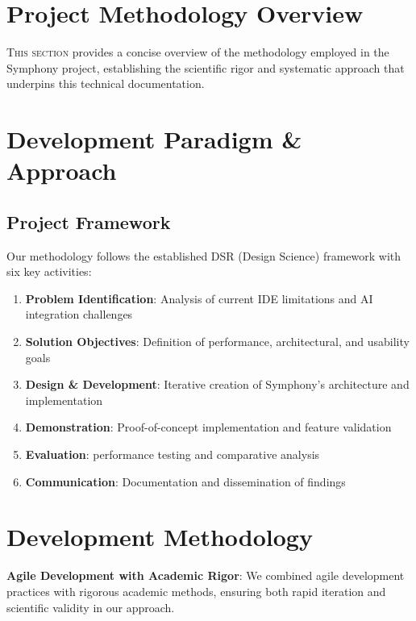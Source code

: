 
\section*{Project Methodology Overview}

\lettrine{T}{his section} provides a concise overview of the methodology employed in the Symphony project, establishing the scientific rigor and systematic approach that underpins this  technical documentation.

\section*{Development Paradigm \& Approach}

\subsection*{Project Framework}
Our methodology follows the established DSR (Design Science) framework with six key activities:

\begin{enumerate}
    \item \textbf{Problem Identification}: Analysis of current IDE limitations and AI integration challenges
    \item \textbf{Solution Objectives}: Definition of performance, architectural, and usability goals
    \item \textbf{Design \& Development}: Iterative creation of Symphony's architecture and implementation
    \item \textbf{Demonstration}: Proof-of-concept implementation and feature validation
    \item \textbf{Evaluation}:  performance testing and comparative analysis
    \item \textbf{Communication}: Documentation and dissemination of findings
\end{enumerate}

\section*{Development Methodology}

\begin{successbox}
\textbf{Agile Development with Academic Rigor}: We combined agile development practices with rigorous academic methods, ensuring both rapid iteration and scientific validity in our approach.
\end{successbox}

